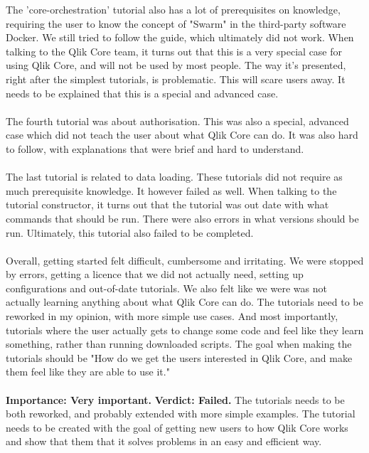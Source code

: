 \documentclass{cslthse-msc}
\begin{document}
    The 'core-orchestration' tutorial also has a lot of prerequisites on knowledge, requiring the user to know the concept of "Swarm" in the third-party software Docker. We still tried to follow the guide, which ultimately did not work. When talking to the Qlik Core team, it turns out that this is a very special case for using Qlik Core, and will not be used by most people. The way it's presented, right after the simplest tutorials, is problematic. This will scare users away. It needs to be explained that this is a special and advanced case. \\\\
    The fourth tutorial was about authorisation. This was also a special, advanced case which did not teach the user about what Qlik Core can do. It was also hard to follow, with explanations that were brief and hard to understand.\\\\
    The last tutorial is related to data loading. These tutorials did not require as much prerequisite knowledge. It however failed as well. When talking to the tutorial constructor, it turns out that the tutorial was out date with what commands that should be run. There were also errors in what versions should be run. Ultimately, this tutorial also failed to be completed.\\\\
    Overall, getting started felt difficult, cumbersome and irritating. We were stopped by errors, getting a licence that we did not actually need, setting up configurations and out-of-date tutorials. We also felt like we were was not actually learning anything about what Qlik Core can do. The tutorials need to be reworked in my opinion, with more simple use cases. And most importantly, tutorials where the user actually gets to change some code and feel like they learn something, rather than running downloaded scripts. The goal when making the tutorials should be "How do we get the users interested in Qlik Core, and make them feel like they are able to use it."\\\\
    \textbf{Importance: Very important.}
    \textbf{Verdict: Failed.} The tutorials needs to be both reworked, and probably extended with more simple examples. The tutorial needs to be created with the goal of getting new users to  how Qlik Core works and show that them that it solves problems in an easy and efficient way.
\end{document}
